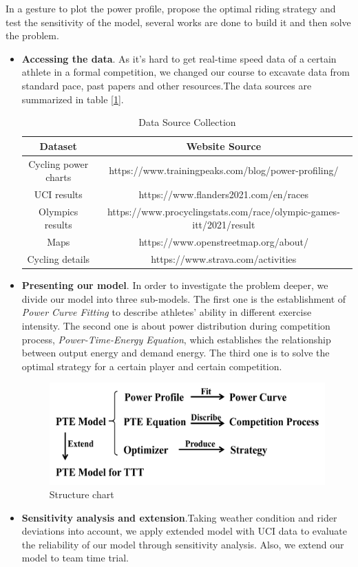 In a gesture to plot the power profile, propose the optimal riding strategy and test the sensitivity of the model, several works are done to build it and then solve the problem.
\begin{itemize}
	\item{\bf Accessing the data}. As it's hard to get real-time speed data of a certain athlete in a formal competition, we changed our course to excavate data from standard pace, past papers and other resources.The data sources are summarized in table [\ref{data}].
		\begin{table}[htbp]
			\setlength{\belowcaptionskip}{0.2cm}
		\centering
		\caption{Data Source Collection}
		\begin{tabular}{cc}
			\toprule[2pt]
			Dataset & Website Source \\
			\midrule
			Cycling power charts & \textcolor[rgb]{ .02,  .388,  .757}{https://www.trainingpeaks.com/blog/power-profiling/} \\
			UCI results & \textcolor[rgb]{ .02,  .388,  .757}{https://www.flanders2021.com/en/races} \\
			Olympics results & \textcolor[rgb]{ .02,  .388,  .757}{https://www.procyclingstats.com/race/olympic-games-itt/2021/result} \\
			Maps  & \textcolor[rgb]{ .02,  .388,  .757}{https://www.openstreetmap.org/about/} \\
			Cycling details & \textcolor[rgb]{ .02,  .388,  .757}{https://www.strava.com/activities} \\
			\bottomrule[2pt]
		\end{tabular}%
		\label{data}%
	\end{table}%
	\item {\bf Presenting our model}. In order to investigate the problem deeper, we divide our model into three sub-models. The first one is the establishment of \emph{Power Curve Fitting} to describe athletes' ability in different exercise intensity. The second one is about power distribution during competition process, \emph{Power-Time-Energy Equation}, which establishes the relationship between output energy and demand energy. The third one is to solve the optimal strategy for a certain player and certain competition.
	
	\begin{figure}
		\centering
		\includegraphics[width=0.7\linewidth]{image/liucheng}
		\caption{Structure chart}
		\label{liucheng}
	\end{figure}
	
	\item {\bf Sensitivity analysis and extension}.Taking weather condition and rider deviations into account, we apply extended model with UCI data to evaluate the reliability of our model through sensitivity analysis. Also, we extend our model to team time trial. 
	
\end{itemize}
